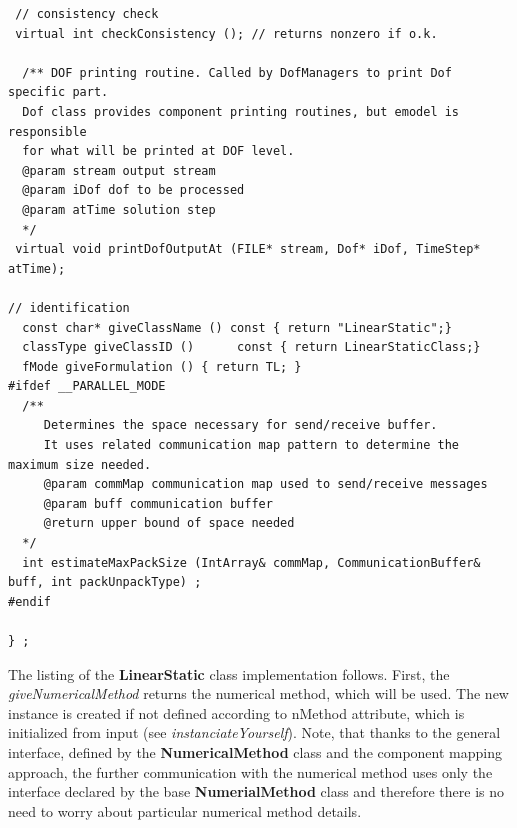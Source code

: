 \documentclass[a4paper]{article}
\newcommand{\class}[1]{{\bf #1}}
\newcommand{\service}[1]{{\em #1}}
\newcommand{\attribute}[1]{#1}
\begin{document}
{\begin{verbatim}
 // consistency check
 virtual int checkConsistency (); // returns nonzero if o.k.

  /** DOF printing routine. Called by DofManagers to print Dof specific part.
  Dof class provides component printing routines, but emodel is responsible
  for what will be printed at DOF level.
  @param stream output stream
  @param iDof dof to be processed
  @param atTime solution step
  */
 virtual void printDofOutputAt (FILE* stream, Dof* iDof, TimeStep* atTime);

// identification
  const char* giveClassName () const { return "LinearStatic";}
  classType giveClassID ()      const { return LinearStaticClass;}
  fMode giveFormulation () { return TL; }
#ifdef __PARALLEL_MODE
  /**
     Determines the space necessary for send/receive buffer.
     It uses related communication map pattern to determine the maximum size needed.
     @param commMap communication map used to send/receive messages
     @param buff communication buffer
     @return upper bound of space needed
  */
  int estimateMaxPackSize (IntArray& commMap, CommunicationBuffer& buff, int packUnpackType) ;
#endif
 
} ;
\end{verbatim}}

The listing of the \class{LinearStatic} class implementation follows. 
First, the \service{giveNumericalMethod} returns  the numerical method,
which will be used. The new instance is created if not defined
according to \attribute{nMethod} attribute, which is initialized from
input (see \service{instanciateYourself}). Note, that thanks to
the general interface, defined by the \class{NumericalMethod} class and the
component mapping approach, the further
communication with the numerical method uses only the interface declared by
the base \class{NumerialMethod} class and therefore there is no need to worry about
particular numerical method details. 
 
\end{document}
